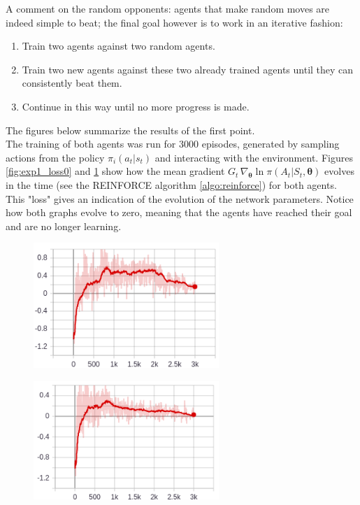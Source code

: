 A comment on the random opponents: agents that make random moves are indeed simple to beat; the final goal however is to work in an iterative fashion: 
\begin{enumerate}
    \item Train two agents against two random agents.
    \item Train two new agents against these two already trained agents until they can consistently beat them.
    \item Continue in this way until no more progress is made.
\end{enumerate}
The figures below summarize the results of the first point.\\

The training of both agents was run for 3000 episodes, generated by sampling actions from the policy $\pi_i(a_t|s_t)$ and interacting with the environment. Figures \ref{fig:exp1_loss0} and \ref{fig:exp1_loss1} show how the mean gradient $G_t \, \nabla_{\bm{\theta}} \ln \pi(A_t|S_t,\bm{\theta})$ evolves in the time (see the REINFORCE algorithm \ref{algo:reinforce}) for both agents. This "loss" gives an indication of the evolution of the network parameters. Notice how both graphs evolve to zero, meaning that the agents have reached their goal and are no longer learning.\\
\begin{figure}
\centering
\begin{minipage}{.5\textwidth}
  \centering
  \includegraphics[width=7cm]{images/experiment1/loss_T0.png}
  \label{fig:exp1_loss0}
\end{minipage}%
\begin{minipage}{.5\textwidth}
  \centering
  \includegraphics[width=7cm]{images/experiment1/loss_T1.png}
  \label{fig:exp1_loss1}
\end{minipage}
\end{figure}

